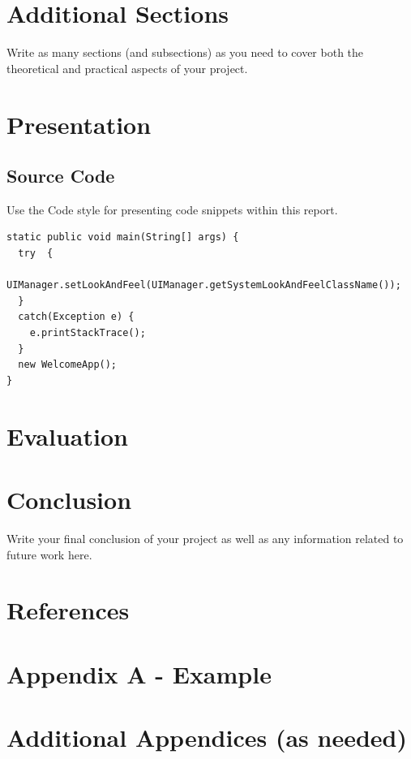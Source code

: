 \documentclass[a4paper,12pt]{article}
\begin{document}
\clearpage


\clearpage
\section{Additional Sections}
Write as many sections (and subsections) as you need to cover both the theoretical and practical aspects of your project.

\clearpage
\section{Presentation}

\subsection{Source Code}
Use the Code style for presenting code snippets within this report.

\begin{lstlisting}
static public void main(String[] args) {
  try  {
    UIManager.setLookAndFeel(UIManager.getSystemLookAndFeelClassName());
  }
  catch(Exception e) {
    e.printStackTrace();
  }
  new WelcomeApp();
}
\end{lstlisting}

\clearpage
\section{Evaluation}

\clearpage
\section{Conclusion}
Write your final conclusion of your project as well as any information related to future work here.

\clearpage
\section*{References}




\clearpage
\section*{Appendix A - Example}

\clearpage
\section*{Additional Appendices (as needed)}
\end{document}
